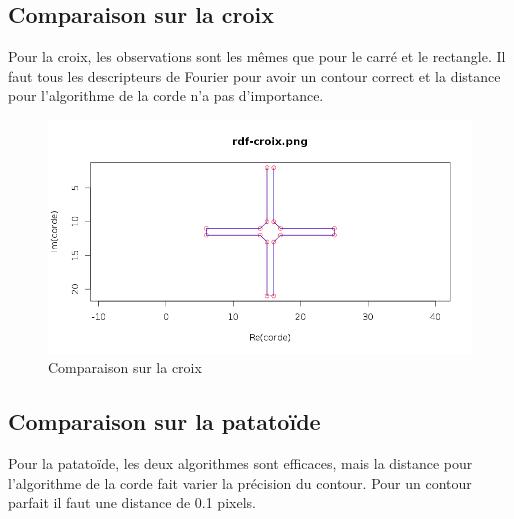 \documentclass[11pt]{article}
\begin{document}
  \newpage
  
  \subsection{Comparaison sur la croix}
  Pour la croix, les observations sont les mêmes que pour le carré et le rectangle. Il faut tous
  les descripteurs de Fourier pour avoir un contour correct et la distance pour l'algorithme de la
  corde n'a pas d'importance.
  
  \begin{center}
    \begin{figure}[!h]
      \includegraphics[width=15cm]{../resultat/comp_croix.png}
      \caption{Comparaison sur la croix}
    \end{figure}
  \end{center}
  
  \newpage
  
  \subsection{Comparaison sur la patatoïde}
  Pour la patatoïde, les deux algorithmes sont efficaces, mais la distance pour l'algorithme de 
  la corde fait varier la précision du contour. Pour un contour parfait il faut une distance de 0.1 pixels.
  
\end{document}
